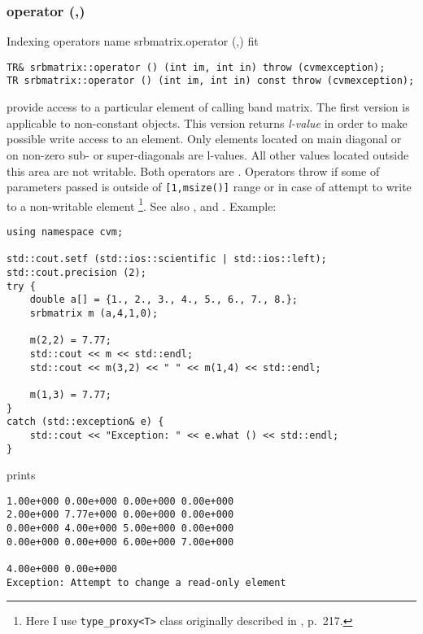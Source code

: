 \subsubsection{operator (,)}
Indexing operators%
\pdfdest name {srbmatrix.operator (,)} fit
\begin{verbatim}
TR& srbmatrix::operator () (int im, int in) throw (cvmexception);
TR srbmatrix::operator () (int im, int in) const throw (cvmexception);
\end{verbatim}
provide access to a particular element of calling band matrix. The first version
is applicable to non-constant objects.
This version returns  \emph{l-value}
in order to make possible write access to an element.
Only elements located on main diagonal or on non-zero
sub- or super-diagonals are l-values. All other values
located outside this area are not writable.
Both operators are \Based.
Operators throw 
if some of parameters passed
is outside of \verb"[1,msize()]" range or
in case of attempt to write to a non-writable element%
\footnote{Here I use \verb"type_proxy<T>" class originally
described in , p.~217.}.
See also ,
 and
.
Example:
\begin{Verbatim}
using namespace cvm;

std::cout.setf (std::ios::scientific | std::ios::left); 
std::cout.precision (2);
try {
    double a[] = {1., 2., 3., 4., 5., 6., 7., 8.};
    srbmatrix m (a,4,1,0);

    m(2,2) = 7.77;
    std::cout << m << std::endl;
    std::cout << m(3,2) << " " << m(1,4) << std::endl;

    m(1,3) = 7.77;
}
catch (std::exception& e) {
    std::cout << "Exception: " << e.what () << std::endl;
}
\end{Verbatim}
prints
\begin{Verbatim}
1.00e+000 0.00e+000 0.00e+000 0.00e+000
2.00e+000 7.77e+000 0.00e+000 0.00e+000
0.00e+000 4.00e+000 5.00e+000 0.00e+000
0.00e+000 0.00e+000 6.00e+000 7.00e+000

4.00e+000 0.00e+000
Exception: Attempt to change a read-only element
\end{Verbatim}
\newpage



